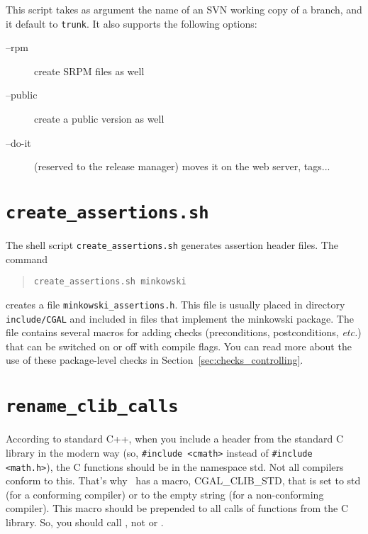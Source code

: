 This script takes as argument the name of an SVN working copy of a branch,
and it default to {\tt trunk}.  It also supports the following options:
\begin{description}
\item[--rpm]      create SRPM files as well
\item[--public]   create a public version as well
\item[--do-it]    (reserved to the release manager) moves it on the web server,
                  tags...
\end{description}


\section{{\tt create\_assertions.sh}}
\label{sec:create_assertions}

The shell script
{{\tt create\_assertions.sh}} generates assertion header files.
The command
\begin{verse}
{\tt create\_assertions.sh minkowski}
\end{verse}
creates a file {\tt minkowski\_assertions.h}.
This file is usually placed in directory {\tt include/CGAL} and included in
files that implement the minkowski package.
The file contains several macros for adding checks (preconditions,
postconditions, {\em etc.}) that can be switched on or off with compile
flags.
You can read more about the use of these package-level checks in
Section~\ref{sec:checks_controlling}.


\section{{\tt rename\_clib\_calls}}
\label{sec:rename_clib_calls}

According to standard C++, when you include a header from the standard C
library in the modern way (so, \verb+#include <cmath>+ instead of
\verb+#include <math.h>+), the C functions should be in the namespace
{\ccFont std}.
Not all compilers conform to this.
That's why \cgal\ has a macro, CGAL\_CLIB\_STD,%
that is set to {\ccFont std} (for
a conforming compiler) or to the empty string (for a non-conforming
compiler). This macro should be prepended to all calls of functions from
the C library. So, you should call , not
 or .

